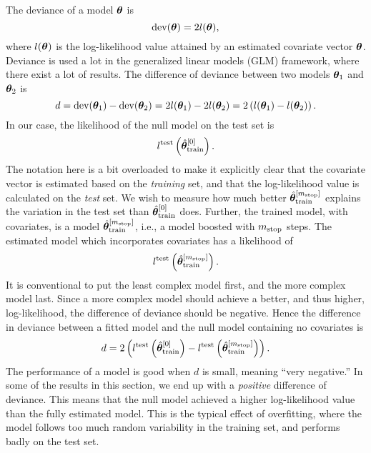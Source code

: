 The deviance of a model $\boldsymbol{\theta}$ is
\begin{equation}
    \text{dev}(\boldsymbol{\theta})=2l(\boldsymbol{\theta}),
\end{equation}
where $l(\boldsymbol{\theta})$ is the log-likelihood value attained by an estimated covariate vector $\boldsymbol{\theta}$.
Deviance is used a lot in the generalized linear models (GLM) framework, where there exist a lot of results.
The difference of deviance between two models $\boldsymbol{\theta}_1$ and $\boldsymbol{\theta}_2$ is
\begin{equation}
    d=\text{dev}(\boldsymbol{\theta}_1)-\text{dev}(\boldsymbol{\theta}_2)=2l(\boldsymbol{\theta}_1)-2l(\boldsymbol{\theta}_2)=2\left(l(\boldsymbol{\theta}_1)-l(\boldsymbol{\theta}_2)\right).
\end{equation}
In our case, the likelihood of the null model on the test set is
\begin{equation}
    l^{\text{test}}\left(\hat{\boldsymbol{\theta}}^{[0]}_{\text{train}}\right).
\end{equation}
The notation here is a bit overloaded to make it explicitly clear that the covariate vector is estimated based on the \textit{training} set, and that the log-likelihood value is calculated on the \textit{test} set.
We wish to measure how much better $\hat{\boldsymbol{\theta}}_{\text{train}}^{[m_{\text{stop}}]}$ explains the variation in the test set than $\hat{\boldsymbol{\theta}}_{\text{train}}^{[0]}$ does.
Further, the trained model, with covariates, is a model $\hat{\boldsymbol{\theta}}^{[m_{\text{stop}}]}_{\text{train}}$, i.e., a model boosted with $m_{\text{stop}}$ steps.
The estimated model which incorporates covariates has a likelihood of
\begin{equation}
    l^{\text{test}}\left(\hat{\boldsymbol{\theta}}^{[m_{\text{stop}}]}_{\text{train}}\right).
\end{equation}
It is conventional to put the least complex model first, and the more complex model last.
Since a more complex model should achieve a better, and thus higher, log-likelihood, the difference of deviance should be negative. 
Hence the difference in deviance between a fitted model and the null model containing no covariates is
\begin{equation*}
    d=2\left(l^{\text{test}}\left(\hat{\boldsymbol{\theta}}^{[0]}_{\text{train}}\right)-l^{\text{test}}\left(\hat{\boldsymbol{\theta}}^{[m_{\text{stop}}]}_{\text{train}}\right)\right).
\end{equation*}
The performance of a model is good when $d$ is small, meaning ``very negative.''
In some of the results in this section, we end up with a \textit{positive} difference of deviance.
This means that the null model achieved a higher log-likelihood value than the fully estimated model.
This is the typical effect of overfitting, where the model follows too much random variability in the training set, and performs badly on the test set.


